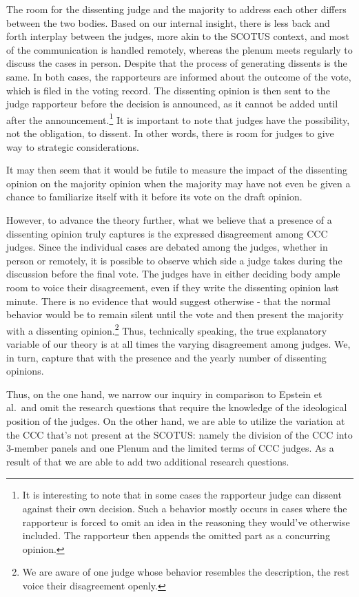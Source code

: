 \documentclass[
  11pt,
]{article}
\begin{document}
The room for the dissenting judge and the majority to address each other
differs between the two bodies. Based on our internal insight, there is
less back and forth interplay between the judges, more akin to the
SCOTUS context, and most of the communication is handled remotely,
whereas the plenum meets regularly to discuss the cases in person.
Despite that the process of generating dissents is the same. In both
cases, the rapporteurs are informed about the outcome of the vote, which
is filed in the voting record. The dissenting opinion is then sent to
the judge rapporteur before the decision is announced, as it cannot be
added until after the announcement.\footnote{It is interesting to note
  that in some cases the rapporteur judge can dissent against their own
  decision. Such a behavior mostly occurs in cases where the rapporteur
  is forced to omit an idea in the reasoning they would've otherwise
  included. The rapporteur then appends the omitted part as a concurring
  opinion.} It is important to note that judges have the possibility,
not the obligation, to dissent. In other words, there is room for judges
to give way to strategic considerations.

It may then seem that it would be futile to measure the impact of the
dissenting opinion on the majority opinion when the majority may have
not even be given a chance to familiarize itself with it before its vote
on the draft opinion.

However, to advance the theory further, what we believe that a presence
of a dissenting opinion truly captures is the expressed disagreement
among CCC judges. Since the individual cases are debated among the
judges, whether in person or remotely, it is possible to observe which
side a judge takes during the discussion before the final vote. The
judges have in either deciding body ample room to voice their
disagreement, even if they write the dissenting opinion last minute.
There is no evidence that would suggest otherwise - that the normal
behavior would be to remain silent until the vote and then present the
majority with a dissenting opinion.\footnote{We are aware of one judge
  whose behavior resembles the description, the rest voice their
  disagreement openly.} Thus, technically speaking, the true explanatory
variable of our theory is at all times the varying disagreement among
judges. We, in turn, capture that with the presence and the yearly
number of dissenting opinions.

Thus, on the one hand, we narrow our inquiry in comparison to Epstein et
al.~and omit the research questions that require the knowledge of the
ideological position of the judges. On the other hand, we are able to
utilize the variation at the CCC that's not present at the SCOTUS:
namely the division of the CCC into 3-member panels and one Plenum and
the limited terms of CCC judges. As a result of that we are able to add
two additional research questions.
\end{document}
